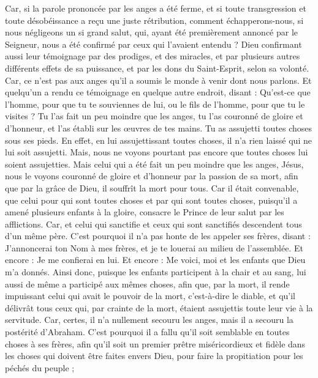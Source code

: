 \begin{multicols}{2}
Car, si la parole prononcée par les anges a été ferme, et si toute transgression et toute désobéissance a reçu une juste rétribution,
comment échapperons-nous, si nous négligeons un si grand salut, qui, ayant été premièrement annoncé par le Seigneur, nous a été confirmé par ceux qui l'avaient entendu ?
Dieu confirmant aussi leur témoignage par des prodiges, et des miracles, et par plusieurs autres différents effets de sa puissance, et par les dons du Saint-Esprit, selon sa volonté.
Car, ce n'est pas aux anges qu'il a soumis le monde à venir dont nous parlons.
Et quelqu'un a rendu ce témoignage en quelque autre endroit, disant : Qu'est-ce que l'homme, pour que tu te souviennes de lui, ou le fils de l'homme, pour que tu le visites ?
Tu l'as fait un peu moindre que les anges, tu l'as couronné de gloire et d'honneur, et l'as établi sur les œuvres de tes mains.
Tu as assujetti toutes choses sous ses pieds. En effet, en lui assujettissant toutes choses, il n'a rien laissé qui ne lui soit assujetti. Mais, nous ne voyons pourtant pas encore que toutes choses lui soient assujetties.
Mais celui qui a été fait un peu moindre que les anges, Jésus, nous le voyons couronné de gloire et d'honneur par la passion de sa mort, afin que par la grâce de Dieu, il souffrît la mort pour tous.
Car il était convenable, que celui pour qui sont toutes choses et par qui sont toutes choses, puisqu'il a amené plusieurs enfants à la gloire, consacre le Prince de leur salut par les afflictions.
Car, et celui qui sanctifie et ceux qui sont sanctifiés descendent tous d'un même père. C'est pourquoi il n'a pas honte de les appeler ses frères,
disant : J'annoncerai ton Nom à mes frères, et je te louerai au milieu de l'assemblée.
Et encore : Je me confierai en lui. Et encore : Me voici, moi et les enfants que Dieu m'a donnés.
Ainsi donc, puisque les enfants participent à la chair et au sang, lui aussi de même a participé aux mêmes choses, afin que, par la mort, il rende impuissant celui qui avait le pouvoir de la mort, c'est-à-dire le diable,
et qu'il délivrât tous ceux qui, par crainte de la mort, étaient assujettis toute leur vie à la servitude.
Car, certes, il n'a nullement secouru les anges, mais il a secouru la postérité d'Abraham.
C'est pourquoi il a fallu qu'il soit semblable en toutes choses à ses frères, afin qu'il soit un premier prêtre miséricordieux et fidèle dans les choses qui doivent être faites envers Dieu, pour faire la propitiation pour les péchés du peuple ;

\end{multicols}
